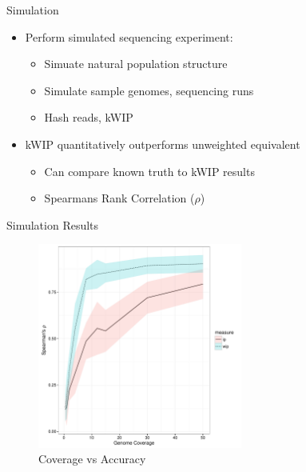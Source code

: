 \documentclass[t]{beamer}
\begin{document}
\begin{frame}{Simulation}
  \begin{itemize}
    \item Perform simulated sequencing experiment:
    \begin{itemize}
      \item Simuate natural population structure
      \item Simulate sample genomes, sequencing runs
      \item Hash reads, kWIP
    \end{itemize}
    \item kWIP quantitatively outperforms unweighted equivalent
      \begin{itemize}
        \item Can compare known truth to kWIP results
        \item Spearmans Rank Correlation ($\rho$)
      \end{itemize}
  \end{itemize}
\end{frame}

\begin{frame}{Simulation Results}
  \begin{figure}
    \centering
    \includegraphics[width=0.6\textwidth]{img/cov_vs_rho_1000.pdf}
    \caption{Coverage vs Accuracy}
  \end{figure}
\end{frame}
\end{document}
